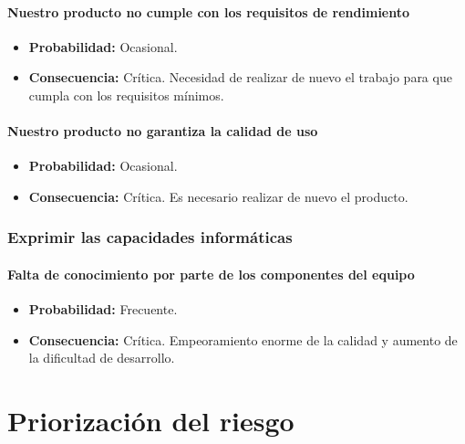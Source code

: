 \documentclass[spanish,a4paper,12pt]{report}	%
\begin{document}
\subsection*{Nuestro producto no cumple con los requisitos de rendimiento}	
	\begin{itemize}
		\item \textbf {Probabilidad: }Ocasional.
		\item \textbf {Consecuencia: }Crítica. Necesidad de realizar de nuevo el trabajo para que cumpla con los requisitos mínimos.
	\end{itemize}

\subsection*{Nuestro producto no garantiza la calidad de uso}	
	\begin{itemize}
		\item \textbf {Probabilidad: }Ocasional.
		\item \textbf {Consecuencia: }Crítica. Es necesario realizar de nuevo el producto.
	\end{itemize}

%
\section{Exprimir las capacidades informáticas}

\subsection*{Falta de conocimiento por parte de los componentes del equipo}	
	\begin{itemize}
		\item \textbf {Probabilidad: }Frecuente.
		\item \textbf {Consecuencia: }Crítica. Empeoramiento enorme de la calidad y aumento de la dificultad de desarrollo.
	\end{itemize}




\newpage
\mbox{}
\thispagestyle{empty}						%
\newpage

\part{Priorización del riesgo}
\end{document}
